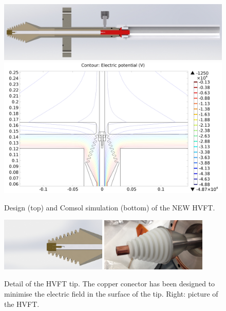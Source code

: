 \begin{figure}[hpt!]
\centering
\includegraphics[width=\textwidth]{FieldCage/img/HVFT_full_image.jpg}
\includegraphics[width=\textwidth]{FieldCage/img/HVFT_with_drift.png}
\caption{Design (top) and Comsol simulation (bottom) of the NEW HVFT.} \label{fig:hvft1}
\end{figure}


\begin{figure}[hpt!]
\centering
\includegraphics[width=0.45\textwidth]{FieldCage/img/HVFT_tip_detail.jpg}
\includegraphics[width=0.45\textwidth]{img/HVFT2.png}
\caption{Detail of the HVFT tip. The copper conector has been designed  to minimise the electric field in the surface of the tip. Right: picture of the HVFT.} \label{fig:hvft_tip}
\end{figure}

